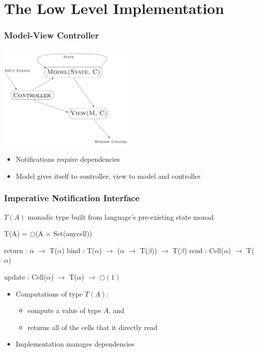 \documentclass[svgnames]{beamer}
\begin{document}
\section{The Low Level Implementation}

\begin{frame}
  \frametitle{Model-View Controller}
 
  \begin{block}{}
    \begin{center}
    \includegraphics[height=2in]{mvc.pdf}
    \end{center}
  \end{block}

  \begin{itemize}
  \item Notifications require dependencies
  \item Model gives itself to controller, view to model and controller
  \end{itemize}
\end{frame}


\begin{frame}[fragile]
  \frametitle{Imperative Notification Interface}

  $T(A)$ monadic type built from language's pre-existing state monad
  \begin{block}{}
  \begin{semiverbatim}
    T(A) = \(\bigcirc\)(A \(\times\) Set(anycell))
 
    return : \(\alpha\) \(\to\) T(\(\alpha\))
    bind   : T(\(\alpha\)) \(\to\) (\(\alpha\) \(\to\) T(\(\beta\))) \(\to\) T(\(\beta\))
    read   : Cell(\(\alpha\)) \(\to\) T(\(\alpha\))

    update : Cell(\(\alpha\)) \(\to\) T(\(\alpha\)) \(\to\) \(\bigcirc(1)\)
  \end{semiverbatim}
  \end{block}
  \begin{itemize}
    \item Computations of type $T(A)$:
      \indent\begin{itemize} 
        \item compute a value of type $A$, and
        \item returns all of the cells that it directly read
      \end{itemize}

    \item Implementation manages dependencies
  \end{itemize}
\end{frame}
\end{document}
